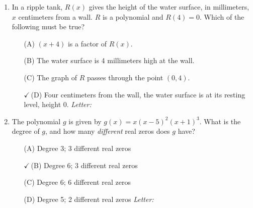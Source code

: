 \documentclass[10pt]{article}
\begin{document}
\begin{enumerate}[leftmargin=1.9em, itemsep=10pt]

\item In a ripple tank, $R(x)$ gives the height of the water surface, in millimeters, $x$
      centimeters from a wall. $R$ is a polynomial and $R(4) = 0$. Which of the following must be
      true?
      \begin{enumerate}[leftmargin=2.6em, itemsep=2pt]
        \item[(A)] $(x + 4)$ is a factor of $R(x)$.
        \item[(B)] The water surface is 4 millimeters high at the wall.
        \item[(C)] The graph of $R$ passes through the point $(0, 4)$.
        \item[{\color{keyred}$\checkmark$\,(D)}] Four centimeters from the wall, the water surface is at its resting level, height 0.
        \hfill\textit{Letter:}~\gradedblank[id=ap1, type=choice, points=1, answer=D]{0.42in}{13pt}
      \end{enumerate}

\item The polynomial $g$ is given by $g(x) = x(x - 5)^2(x + 1)^3$. What is the degree of $g$, and
      how many \emph{different} real zeros does $g$ have?
      \begin{enumerate}[leftmargin=2.6em, itemsep=2pt]
        \item[(A)] Degree 3; 3 different real zeros
        \item[{\color{keyred}$\checkmark$\,(B)}] Degree 6; 3 different real zeros
        \item[(C)] Degree 6; 6 different real zeros
        \item[(D)] Degree 5; 2 different real zeros \hfill\textit{Letter:}~\gradedblank[id=ap2, type=choice, points=1, answer=B]{0.42in}{13pt}
      \end{enumerate}


\end{enumerate}
\end{document}
